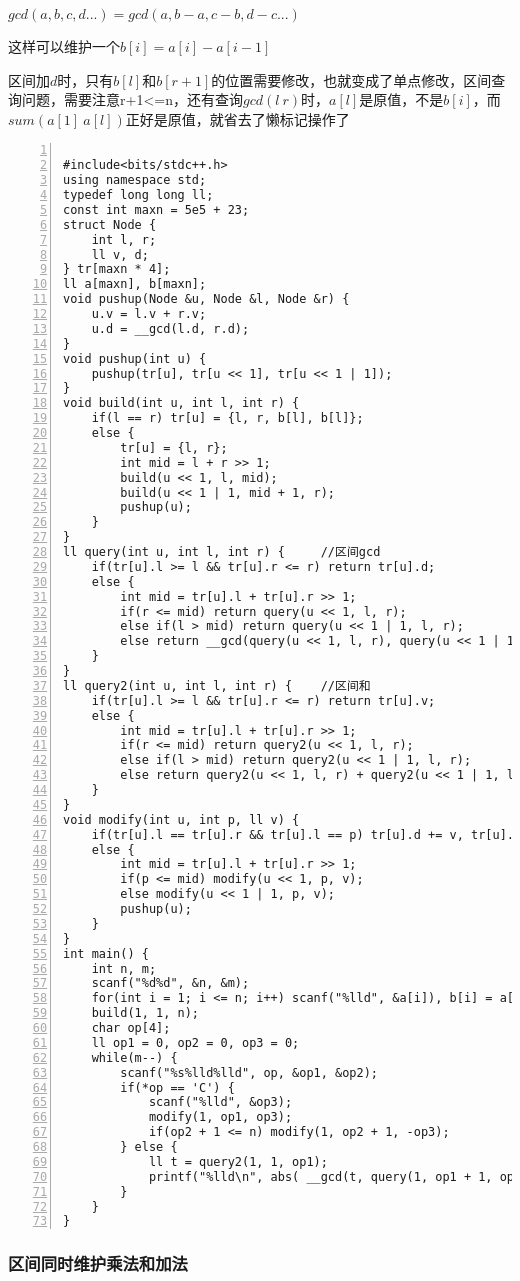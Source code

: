 $gcd(a,b,c,d...)=gcd(a,b-a,c-b,d-c...)$

这样可以维护一个$b[i]=a[i]-a[i-1]$

区间加$d$时，只有$b[l]和b[r+1]$的位置需要修改，也就变成了单点修改，区间查询问题，需要注意r+1<=n，还有查询$gcd(l~r)$时，$a[l]$是原值，不是$b[i]$，而$sum(a[1]~a[l])$正好是原值，就省去了懒标记操作了
\begin{lstlisting}[language={[ANSI]C},numbers=left]

#include<bits/stdc++.h>
using namespace std;
typedef long long ll;
const int maxn = 5e5 + 23;
struct Node {
	int l, r;
	ll v, d;
} tr[maxn * 4];
ll a[maxn], b[maxn];
void pushup(Node &u, Node &l, Node &r) {
	u.v = l.v + r.v;
	u.d = __gcd(l.d, r.d);
}
void pushup(int u) {
	pushup(tr[u], tr[u << 1], tr[u << 1 | 1]);
}
void build(int u, int l, int r) {
	if(l == r) tr[u] = {l, r, b[l], b[l]};
	else {
		tr[u] = {l, r};
		int mid = l + r >> 1;
		build(u << 1, l, mid);
		build(u << 1 | 1, mid + 1, r);
		pushup(u);
	}
}
ll query(int u, int l, int r) {		//区间gcd 
	if(tr[u].l >= l && tr[u].r <= r) return tr[u].d;
	else {
		int mid = tr[u].l + tr[u].r >> 1;
		if(r <= mid) return query(u << 1, l, r);
		else if(l > mid) return query(u << 1 | 1, l, r);
		else return __gcd(query(u << 1, l, r), query(u << 1 | 1, l, r));
	}
}
ll query2(int u, int l, int r) {	//区间和 
	if(tr[u].l >= l && tr[u].r <= r) return tr[u].v;
	else {
		int mid = tr[u].l + tr[u].r >> 1;
		if(r <= mid) return query2(u << 1, l, r);
		else if(l > mid) return query2(u << 1 | 1, l, r);
		else return query2(u << 1, l, r) + query2(u << 1 | 1, l, r);
	}
}
void modify(int u, int p, ll v) {
	if(tr[u].l == tr[u].r && tr[u].l == p) tr[u].d += v, tr[u].v += v;
	else {
		int mid = tr[u].l + tr[u].r >> 1;
		if(p <= mid) modify(u << 1, p, v);
		else modify(u << 1 | 1, p, v);
		pushup(u);
	}
}
int main() {
	int n, m;
	scanf("%d%d", &n, &m);
	for(int i = 1; i <= n; i++) scanf("%lld", &a[i]), b[i] = a[i] - a[i - 1];
	build(1, 1, n);
	char op[4];
	ll op1 = 0, op2 = 0, op3 = 0;
	while(m--) {
		scanf("%s%lld%lld", op, &op1, &op2);
		if(*op == 'C') {
			scanf("%lld", &op3);
			modify(1, op1, op3);
			if(op2 + 1 <= n) modify(1, op2 + 1, -op3);
		} else {
			ll t = query2(1, 1, op1);
			printf("%lld\n", abs( __gcd(t, query(1, op1 + 1, op2))));
		}
	}
}
\end{lstlisting}

\subsubsection{区间同时维护乘法和加法}

